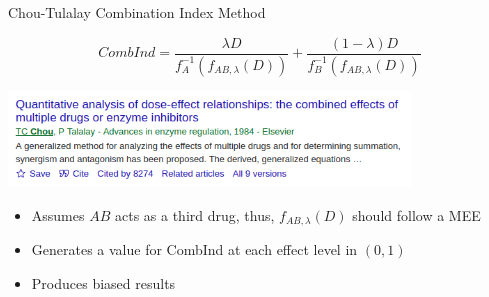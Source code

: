 \documentclass{beamer}
\begin{document}
\begin{frame}{Chou-Tulalay Combination Index Method}
    \begin{Definition}
        \[
            CombInd = \frac{\lambda D}{f_A^{-1} (f_{AB, \lambda}(D))} + \frac{(1 - \lambda) D}{f_B^{-1} (f_{AB, \lambda}(D))}
        \]
    \end{Definition}
    \begin{center}
        \includegraphics[width=0.8\textwidth]{figs/cimethod-scholar.png}
    \end{center}

    \vfill 

    \begin{itemize}
        \item Assumes $AB$ acts as a third drug, thus, $f_{AB, \lambda}(D)$ should follow a MEE
        \item Generates a value for CombInd at each effect level in $(0,1)$
        \item Produces biased results
    \end{itemize}
\end{frame}
\end{document}
